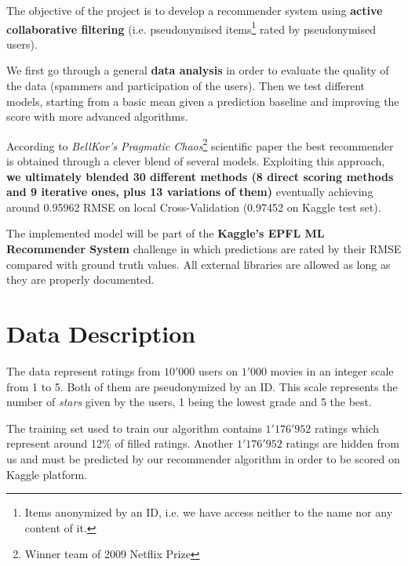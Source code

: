 \documentclass[10pt,conference,compsocconf]{IEEEtran}
\begin{document}
The objective of the project is to develop a recommender system using \textbf{active collaborative filtering} (i.e. pseudonymised items\footnote{Items anonymized by an ID, i.e. we have access neither to the name nor any content of it.} rated by pseudonymised users).

We first go through a general \textbf{data analysis} in order to evaluate the quality of the data (spammers and participation of the users). Then we test different models, starting from a basic mean given a prediction baseline and improving the score with more advanced algorithms.

According to \textit{BellKor's Pragmatic Chaos}\footnote{Winner team of 2009 Netflix Prize} scientific paper \cite{BellKore_netflix} the best recommender is obtained through a clever blend of several models. Exploiting this approach, \textbf{we ultimately blended 30 different methods (8 direct scoring methods and 9 iterative ones, plus 13 variations of them)} eventually achieving around 0.95962 RMSE on local Cross-Validation (0.97452 on Kaggle test set).

The implemented model will be part of the \textbf{Kaggle's EPFL ML Recommender System} challenge in which predictions are rated by their RMSE compared with ground truth values. All external libraries are allowed as long as they are properly documented.

\section{Data Description}

The data represent ratings from $10'000$ users on $1'000$ movies in an integer scale from 1 to 5. Both of them are pseudonymized by an ID. This scale represents the number of \textit{stars} given by the users, 1 being the lowest grade and 5 the best.

The training set used to train our algorithm contains $1'176'952$ ratings which represent around 12\% of filled ratings. 
Another $1'176'952$ ratings are hidden from us and must be predicted by our recommender algorithm in order to be scored on Kaggle platform.


\end{document}

